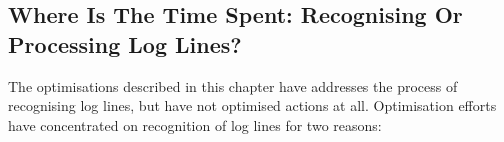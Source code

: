 
\FloatBarrier{}

\subsection{Where Is The Time Spent: Recognising Or Processing Log Lines?}

\label{recognising vs processing}

The optimisations described in this chapter have addresses the process of
recognising log lines, but have not optimised actions at all.  Optimisation
efforts have concentrated on recognition of log lines for two reasons:

